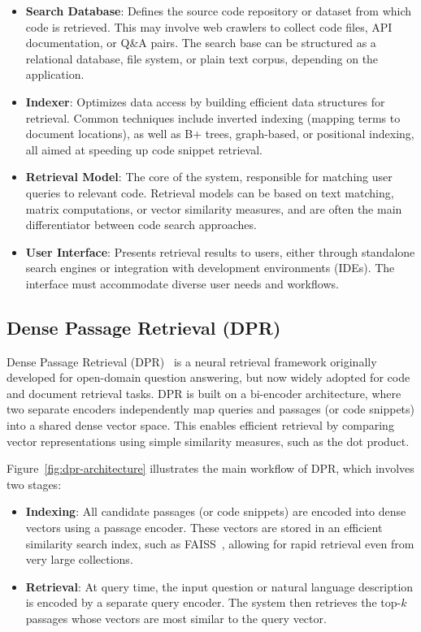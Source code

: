 \documentclass[12pt]{article}
\begin{document}
\begin{itemize}
    \item \textbf{Search Database}: Defines the source code repository or dataset from which code is retrieved. This may involve web crawlers to collect code files, API documentation, or Q\&A pairs. The search base can be structured as a relational database, file system, or plain text corpus, depending on the application.
    \item \textbf{Indexer}: Optimizes data access by building efficient data structures for retrieval. Common techniques include inverted indexing (mapping terms to document locations), as well as B+ trees, graph-based, or positional indexing, all aimed at speeding up code snippet retrieval.
    \item \textbf{Retrieval Model}: The core of the system, responsible for matching user queries to relevant code. Retrieval models can be based on text matching, matrix computations, or vector similarity measures, and are often the main differentiator between code search approaches.
    \item \textbf{User Interface}: Presents retrieval results to users, either through standalone search engines or integration with development environments (IDEs). The interface must accommodate diverse user needs and workflows.
\end{itemize}

\subsection{Dense Passage Retrieval (DPR)}

Dense Passage Retrieval (DPR)~\cite{Karpukhin2020} is a neural retrieval framework originally developed for open-domain question answering, but now widely adopted for code and document retrieval tasks. DPR is built on a bi-encoder architecture, where two separate encoders independently map queries and passages (or code snippets) into a shared dense vector space. This enables efficient retrieval by comparing vector representations using simple similarity measures, such as the dot product.

Figure~\ref{fig:dpr-architecture} illustrates the main workflow of DPR, which involves two stages:
\begin{itemize}
    \item \textbf{Indexing}: All candidate passages (or code snippets) are encoded into dense vectors using a passage encoder. These vectors are stored in an efficient similarity search index, such as FAISS~\cite{Johnson2017}, allowing for rapid retrieval even from very large collections.
    \item \textbf{Retrieval}: At query time, the input question or natural language description is encoded by a separate query encoder. The system then retrieves the top-$k$ passages whose vectors are most similar to the query vector.
\end{itemize}
\end{document}
